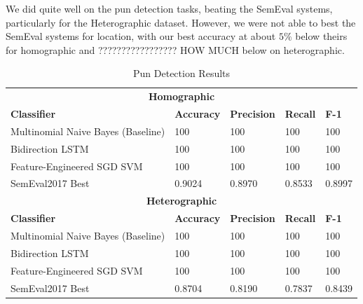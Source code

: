 \documentclass{article}
\begin{document}
We did quite well on the pun detection tasks, beating the SemEval systems,
particularly for the Heterographic dataset. However, we were not able to best
the SemEval systems for location, with our best accuracy at about $5\%$ below
theirs for homographic and ????????????????? HOW MUCH below on heterographic.

\begin{table}
\caption{Pun Detection Results}\label{tab:pun_detection_results}
\begin{center}
\begin{tabular}{l l l l l} 
\toprule
\multicolumn{5}{c}{\textbf{Homographic}}\\
\textbf{Classifier}					& \textbf{Accuracy}	& \textbf{Precision}	& \textbf{Recall}	& \textbf{F-1}\\
Multinomial Naive Bayes (Baseline)	& 100				& 100					& 100				& 100\\
Bidirection LSTM					& 100				& 100 					& 100				& 100\\
Feature-Engineered SGD SVM			& 100				& 100 					& 100				& 100\\
SemEval2017 Best					& 0.9024			& 0.8970				& 0.8533			& 0.8997\\
\midrule
\multicolumn{5}{c}{\textbf{Heterographic}}\\
\textbf{Classifier}					& \textbf{Accuracy}	& \textbf{Precision}	& \textbf{Recall}	& \textbf{F-1}\\
Multinomial Naive Bayes (Baseline)	& 100				& 100					& 100				& 100\\
Bidirection LSTM					& 100				& 100 					& 100				& 100\\
Feature-Engineered SGD SVM			& 100				& 100 					& 100				& 100\\
SemEval2017 Best					& 0.8704			& 0.8190				& 0.7837			& 0.8439\\
\bottomrule
\end{tabular}
\end{center}
\end{table}
\end{document}
